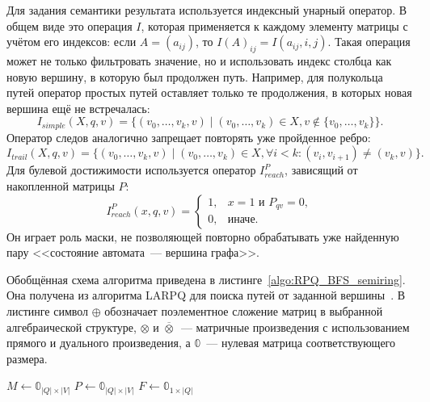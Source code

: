 Для задания семантики результата используется индексный унарный оператор.
В общем виде это операция $I$, которая применяется к каждому элементу матрицы с учётом его индексов: если $A = (a_{ij})$, то $I(A)_{ij} = I(a_{ij}, i, j)$.
Такая операция может не только фильтровать значение, но и использовать индекс столбца как новую вершину, в которую был продолжен путь.
Например, для полукольца путей оператор простых путей оставляет только те продолжения, в которых новая вершина ещё не встречалась:
\[
    I_{\mathit{simple}}(X, q, v)
    = \{(v_0, \dots, v_k, v) \mid (v_0, \dots, v_k) \in X, v \notin \{v_0, \dots, v_k\}\}.
\]
Оператор следов аналогично запрещает повторять уже пройденное ребро:
\[
    I_{\mathit{trail}}(X, q, v)
    = \{(v_0, \dots, v_k, v) \mid (v_0, \dots, v_k) \in X, \forall i < k: (v_i, v_{i+1}) \neq (v_k, v)\}.
\]
Для булевой достижимости используется оператор $I^P_{\mathit{reach}}$, зависящий от накопленной матрицы $P$:
\[
    I^P_{\mathit{reach}}(x, q, v)
    =
    \begin{cases}
        1, & x = 1 \text{ и } P_{qv} = 0, \\
        0, & \text{иначе.}
    \end{cases}
\]
Он играет роль маски, не позволяющей повторно обрабатывать уже найденную пару <<состояние автомата~--- вершина графа>>.

Обобщённая схема алгоритма приведена в листинге~\ref{algo:RPQ_BFS_semiring}.
Она получена из алгоритма LARPQ для поиска путей от заданной вершины~.
В листинге символ $\oplus$ обозначает поэлементное сложение матриц в выбранной алгебраической структуре, $\otimes$ и $\overline{\otimes}$~--- матричные произведения с использованием прямого и дуального произведения, а $\Bbbzero$~--- нулевая матрица соответствующего размера.

\begin{algorithm}
    $M \leftarrow \Bbbzero_{|Q| \times |V|}$\;
    $P \leftarrow \Bbbzero_{|Q| \times |V|}$\;
    $F \leftarrow \Bbbzero_{1 \times |Q|}$\;
    \;
    \caption{Обобщённый алгоритм поиска путей от заданной вершины с регулярными ограничениями}
    \label{algo:RPQ_BFS_semiring}
\end{algorithm}

